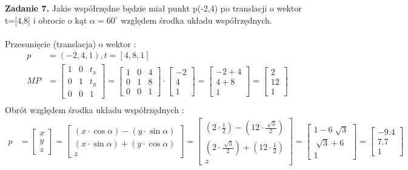 \documentclass[a4paper]{article}
\begin{document}
\noindent\textbf{Zadanie 7.}
\noindent\textnormal{Jakie współrzędne będzie miał punkt p(-2,4) po translacji o wektor t=[4,8] i
obrocie o kąt $\alpha=60^{\circ}$ względem środka układu współrzędnych.} \\ \\
Przesunięcie (translacja) o wektor :
\begin{align*}
p &= (-2 , 4 , 1) , t = [ 4 , 8 , 1] \\
MP &= 
\left[
\begin{matrix}
1 & 0 & t_x \\
0 & 1 & t_y \\
0 & 0 & 1
\end{matrix}
\right] =
\left[
\begin{matrix}
1 & 0 & 4\\
0 & 1 & 8\\
0 & 0 & 1
\end{matrix}
\right]
\cdot
\left[
\begin{matrix}
-2 \\ 4 \\ 1
\end{matrix}
\right]
=
\left[
\begin{matrix}
-2 + 4 \\ 4 +8  \\ 1
\end{matrix}
\right] 
=
\left[
\begin{matrix}
2 \\ 12 \\ 1
\end{matrix}
\right] \\
\end{align*}
Obrót względem środka układu współrzędnych :
\begin{align*}
p &=
\left[
\begin{matrix}
x \\ y \\ z
\end{matrix}
\right] = 
\left[
\begin{matrix}
\left( x \cdot \cos\alpha\right) - \left( y \cdot \sin\alpha\right) \\
(x \cdot \sin\alpha) + (y \cdot \cos\alpha)\\
z
\end{matrix}
\right]
= 
\left[
\begin{matrix}
( 2 \cdot \frac{1}{2}) - ( 12 \cdot \frac{\sqrt[]{3}}{2}) \\
( 2 \cdot \frac{\sqrt[]{3}}{2}) + ( 12 \cdot \frac{1}{2})\\
z
\end{matrix}
\right]
= 
\left[
\begin{matrix}
1 - 6 \sqrt[]{3} \\
\sqrt[]{3} + 6   \\
1
\end{matrix}
\right]
= 
\left[
\begin{matrix}
-9.4 \\
7.7   \\
1
\end{matrix}
\right]
\end{align*}
\end{document}
